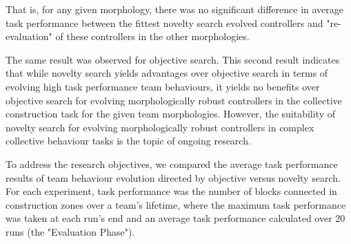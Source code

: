 That is, for any given morphology, there was no significant difference in average task performance between the fittest novelty search evolved controllers and "re-evaluation" of these controllers in the other morphologies. 

The same result was observed for objective search.
This second result indicates that while novelty search yields advantages over objective search in terms of evolving high task performance team behaviours, it yields no benefits over objective search for evolving morphologically robust controllers in the collective construction task for the given team morphologies.
However, the suitability of novelty search for evolving morphologically robust controllers in complex collective behaviour tasks is the topic of ongoing research.






To address the research objectives, we compared the average task performance results of team behaviour evolution directed by objective versus novelty search. 
For each experiment, task performance was the number of blocks connected in construction zones over a team's lifetime, where the maximum task performance was taken at each run's end and an average task performance calculated over 20 runs (the "Evaluation Phase").










